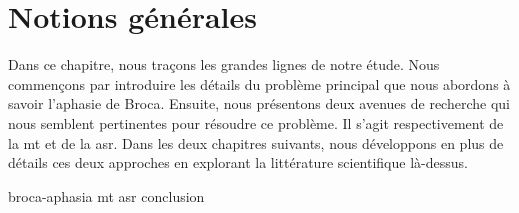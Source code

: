 \chapter{Notions générales}
\label{chap.general-notions}

Dans ce chapitre, nous traçons les grandes lignes de notre étude.
Nous commençons par introduire les détails du problème principal que nous abordons à savoir l'aphasie de Broca.
Ensuite, nous présentons deux avenues de recherche qui nous semblent pertinentes pour résoudre ce problème.
Il s'agit respectivement de la \gls{mt} et de la \gls{asr}.
Dans les deux chapitres suivants, 
nous développons en plus de détails ces deux approches
en explorant la littérature scientifique là-dessus.

{broca-aphasia}
{mt}
{asr}
{conclusion}